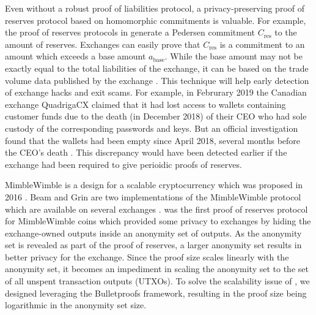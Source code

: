 Even without a robust proof of liabilities protocol, a privacy-preserving proof of reserves protocol based on homomorphic commitments is valuable. For example, the proof of reserves protocols in \cite{Dagher2015,Dutta2019a,Dutta2019b} generate a Pedersen commitment $C_{\text{res}}$ to the amount of reserves. Exchanges can easily prove that $C_{\text{res}}$ is a commitment to an amount which exceeds a base amount $a_{\text{base}}$. While the base amount may not be exactly equal to the total liabilities of the exchange, it can be based on the trade volume data published by the exchange \cite{Coinmarketcap}. This technique will help early detection of exchange hacks and exit scams. For example, in Februrary 2019 the Canadian exchange QuadrigaCX claimed that it had lost access to wallets containing customer funds due to the death (in December 2018) of their CEO who had sole custody of the corresponding passwords and keys. But an official investigation found that the wallets had been empty since April 2018, several months before the CEO's death \cite{QuadrigaCXEmpty, EYThirdReport}. This discrepancy would have been detected earlier if the exchange had been required to give perioidic proofs of reserves.

MimbleWimble is a design for a scalable cryptocurrency which was proposed in 2016 \cite{Jedusor2016}. Beam and Grin are two implementations of the MimbleWimble protocol which are available on several exchanges \cite{Coinmarketcap}. \R \cite{Dutta2019b} was the first proof of reserves protocol for MimbleWimble coins which provided some privacy to exchanges by hiding the exchange-owned outputs inside an anonymity set of outputs. As the anonymity set is revealed as part of the proof of reserves, a larger anonymity set results in better privacy for the exchange. Since the \R proof size scales linearly with the anonymity set, it becomes an impediment in scaling the anonymity set to the set of all unspent transaction outputs (UTXOs).
To solve the scalability issue of \Rw, we designed \RB leveraging the Bulletproofs \cite{Bunz2018} framework, resulting in the proof size being logarithmic in the anonymity set size.\\[-6pt]   

